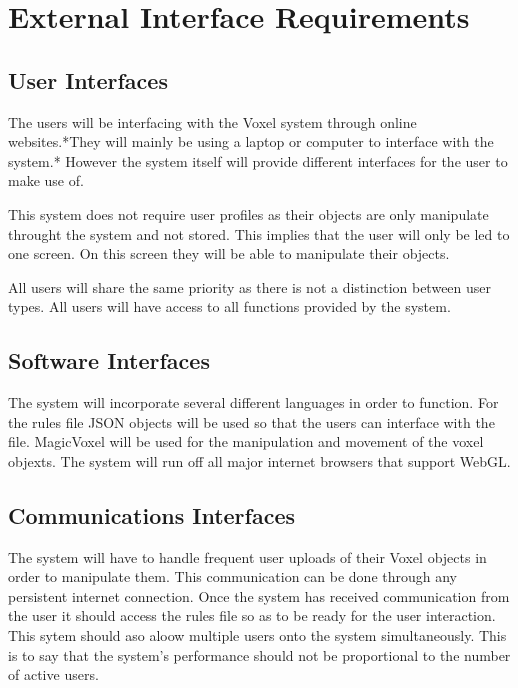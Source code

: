 \documentclass[english]{article}
\begin{document}
	\pagebreak
	
	\section{External Interface Requirements}
	
		\subsection{User Interfaces}
		The users will be interfacing with the Voxel system through online websites.*They will mainly be using a laptop or
		computer to interface with the system.* However the system itself will provide different interfaces for the user to make
		use of.
		
		This system does not require user profiles as their objects are only manipulate throught the system and not stored. This 
		implies that the user will only be led to one screen. On this screen they will be able to manipulate their objects.
		
		All users will share the same priority as there is not a distinction between user types. All users will have access to 
		all functions provided by the system.
		
		\subsection{Software Interfaces}
		The system will incorporate several different languages in order to function. For the rules file JSON objects will be 
		used so that the users can interface with the file. MagicVoxel will be used for the manipulation and movement of the 
		voxel objexts. The system will run off all major internet browsers that support WebGL.
		
		\subsection{Communications Interfaces}
		The system will have to handle frequent user uploads of their Voxel objects in order to manipulate them. This
		communication can be done through any persistent internet connection. Once the system has received communication from 
		the user it should access the rules file so as to be ready for the user interaction. This sytem should aso aloow 
		multiple users onto the system simultaneously. This is to say that the system's performance should not be proportional 
		to the number of active users.
		
	\pagebreak
	
\end{document}
